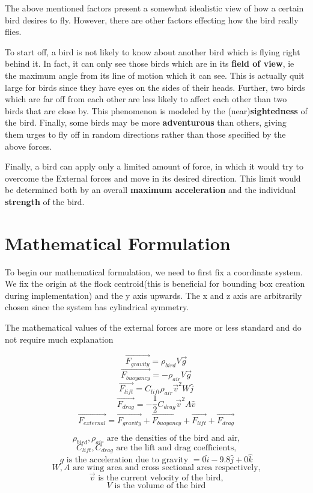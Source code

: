 \documentclass{article}
\begin{document}
The above mentioned factors present a somewhat idealistic view of how a certain bird desires to fly. However, there are other factors effecting how the bird really flies.

To start off, a bird is not likely to know about another bird which is flying right behind it. In fact, it can only see those birds which are in its \textbf{field of view}, ie the maximum angle from its line of motion which it can see. This is actually quit large for birds since they have eyes on the sides of their heads. Further, two birds which are far off from each other are less likely to affect each other than two birds that are close by. This phenomenon is modeled by the (near)\textbf{sightedness} of the bird. Finally, some birds may be more \textbf{adventurous} than others, giving them urges to fly off in random directions rather than those specified by the above forces.

Finally, a bird can apply only a limited amount of force, in which it would try to overcome the External forces and move in its desired direction. This limit would be determined both by an overall \textbf{maximum acceleration} and the individual \textbf{strength} of the bird.
\section{Mathematical Formulation}
To begin our mathematical formulation, we need to first fix a coordinate system. We fix the origin at the flock centroid(this is beneficial for bounding box creation during implementation) and the y axis upwards. The x and z axis are arbitrarily chosen since the system has cylindrical symmetry.

The mathematical values of the external forces are more or less standard and do not require much explanation
\begin{center}

    $$\vec{F_{gravity}}=\rho_{bird}V\vec{g}$$
    $$\vec{F_{buoyancy}}=-\rho_{air}V\vec{g}$$
    $$\vec{F_{lift}}=C_{lift}\rho_{air}\vec{v}^2W\hat{j}$$
    $$\vec{F_{drag}}=-\frac{1}{2} C_{drag}\vec{v}^2A\hat{v}$$
    $$\vec{F_{external}}=\vec{F_{gravity}}+\vec{F_{buoyancy}}+\vec{F_{lift}}+\vec{F_{drag}}$$

    $$\rho_{bird},\rho_{air} \text{ are the densities of the bird and air,}$$
    $$C_{lift}, C_{drag} \text{ are the lift and drag coefficients,}$$
    $$g \text{ is the acceleration due to gravity }=0\hat{i}-9.8\hat{j}+0\hat{k}$$
    $$W, A \text{ are wing area and cross sectional area respectively,}$$
    $$\vec{v} \text{ is the current velocity of the bird,}$$
    $$V \text{ is the volume of the bird}$$
 
\end{center}
\end{document}
